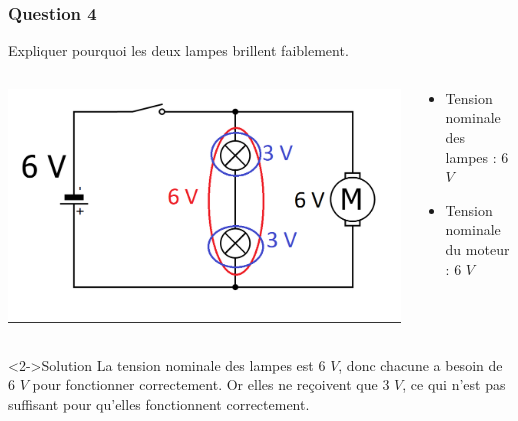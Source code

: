 \documentclass[xcolor={dvipsnames}]{beamer}
\begin{document}
\begin{frame}
\frametitle{Question 4}
\begin{block}{}
	Expliquer pourquoi les deux lampes brillent faiblement.
\end{block}


\begin{columns}
	\begin{column}{0.4\textwidth}
		\includegraphics[scale=0.2]{../4_schema}
		
	\end{column}
	
	\begin{column}{0.6\textwidth}
		\begin{itemize}
			\item Tension nominale des lampes : 6 $V$
			\item Tension nominale du moteur : 6 $V$
		\end{itemize}		
		
	\end{column}
\end{columns}

\begin{block}<2->{Solution}
	La tension nominale des lampes est 6 $V$, donc chacune a besoin de 6 $V$ pour fonctionner correctement. Or elles ne reçoivent que 3 $V$, ce qui n'est pas suffisant pour qu'elles fonctionnent correctement.
\end{block}


\end{frame}
%
%	
%
%
%	
\end{document}
